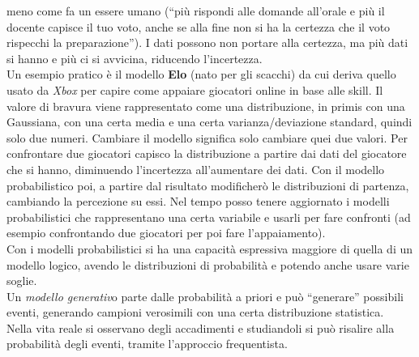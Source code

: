 \message{ !name(modprob.tex)}\documentclass[a4paper,12pt, oneside]{book}
\begin{document}
meno come fa un essere umano (``più rispondi alle domande all'orale e più il
docente capisce il tuo voto, anche se alla fine non si ha la certezza che il
voto rispecchi la preparazione''). I dati possono non portare alla certezza, ma
più dati si hanno e più ci si avvicina, riducendo l'incertezza.\\
Un esempio pratico è il modello \textbf{Elo} (nato per gli scacchi) da cui
deriva quello usato da \textit{Xbox} per capire come appaiare giocatori online
in base alle skill. Il valore di bravura viene rappresentato come una
distribuzione, in primis con una Gaussiana, con una certa media e una certa
varianza/deviazione standard, quindi solo due numeri. Cambiare il modello
significa solo cambiare quei due valori. Per confrontare due giocatori capisco
la distribuzione a partire dai dati del giocatore che si hanno, diminuendo
l'incertezza all'aumentare dei dati. Con il modello probabilistico poi, a
partire dal risultato modificherò le distribuzioni di partenza, cambiando la
percezione su essi. Nel tempo posso tenere aggiornato i modelli probabilistici
che rappresentano una certa variabile e usarli per fare confronti (ad esempio
confrontando due giocatori per poi fare l'appaiamento).\\
Con i modelli probabilistici si ha una capacità espressiva maggiore di quella di
un modello logico, avendo le distribuzioni di probabilità e potendo anche usare
varie soglie.\\
Un \textit{modello generativ}o parte dalle probabilità a priori e può
``generare'' possibili eventi, generando campioni verosimili con una certa
distribuzione statistica. \\
Nella vita reale si osservano degli accadimenti e studiandoli si può risalire
alla probabilità degli eventi, tramite l'approccio frequentista.
\end{document}
